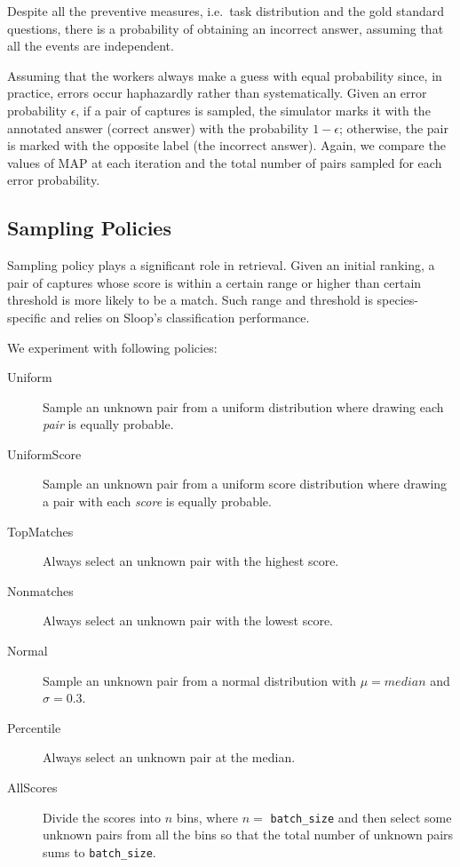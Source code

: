 Despite all the preventive measures, i.e.\ task distribution and the gold
standard questions, there is a probability of obtaining an incorrect answer,
assuming that all the events are independent.

Assuming that the workers always make a guess with equal probability since, in
practice, errors occur haphazardly rather than systematically. Given an error
probability $\epsilon$, if a pair of captures is sampled, the simulator marks it
with the annotated answer (correct answer) with the probability $1-\epsilon$;
otherwise, the pair is marked with the opposite label (the incorrect answer).
Again, we compare the values of MAP at each iteration and the total number of
pairs sampled for each error probability.

\subsection{Sampling Policies} %
\label{sub:sampling_policies}

Sampling policy plays a significant role in retrieval. Given an initial
ranking, a pair of captures whose score is within a certain range or higher
than certain threshold is more likely to be a match. Such range and threshold
is species-specific and relies on Sloop's classification performance.

We experiment with following policies:
\begin{description}
  \item [Uniform]
  Sample an unknown pair from a uniform distribution where drawing each
    \emph{pair} is equally probable.
  \item [UniformScore]
  Sample an unknown pair from a uniform score distribution where drawing a pair
    with each \emph{score} is equally probable.
  \item [TopMatches]
  Always select an unknown pair with the highest score.
  \item [Nonmatches]
  Always select an unknown pair with the lowest score.
  \item [Normal]
  Sample an unknown pair from a normal distribution with $\mu=median$ and
    $\sigma=0.3$.
  \item [Percentile]
  Always select an unknown pair at the median.
  \item [AllScores]
  Divide the scores into $n$ bins, where $n=$ \texttt{batch\_size} and then
  select some unknown pairs from all the bins so that the total number of
  unknown pairs sums to \texttt{batch\_size}.
\end{description}

